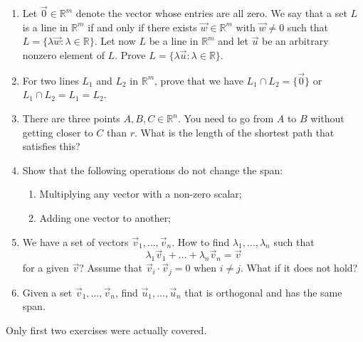 \documentclass{article}
\begin{document}
\begin{enumerate}
    \item Let $\vec 0 \in \mathbb R^m$ denote the vector whose entries are all zero. We say that a set $L$ is a line in $\mathbb R^m$
if and only if there exists $\vec w \in \mathbb R^m$ with $\vec w \neq 0$ such that $L = \{\lambda \vec w : \lambda \in \mathbb R\}$. Let now $L$ be a line in $\mathbb R^m$ and let $\vec u$ be an arbitrary nonzero element of $L$. Prove $L = \{\lambda \vec u : \lambda \in \mathbb R\}$.
\item For two lines $L_1$ and $L_2$ in $\mathbb R^m$, prove that we have $L_1 \cap L_2 = \{\vec 0\}$ or $L_1 \cap L_2 =
L_1 = L_2$.
\item There are three points $A,B,C \in \mathbb R^n$. You need to go from $A$ to $B$ without getting closer to $C$ than $r$. What is the length of the shortest path that satisfies this?
\item Show that the following operations do not change the span:
\begin{enumerate}
    \item Multiplying any vector with a non-zero scalar;
    \item Adding one vector to another;
\end{enumerate}
\item We have a set of vectors $\vec v_1,\dots,\vec v_n$. How to find $\lambda_1,\dots,\lambda_n$ such that
$$
\lambda_1 \vec v_1 + \dots + \lambda_n \vec v_n = \vec v
$$
for a given $\vec v$? Assume that $\vec v_i \cdot \vec v_j = 0$ when $i \neq j$. What if it does not hold?
\item Given a set $\vec v_1, \dots, \vec v_n$, find $\vec u_1, \dots, \vec u_n$ that is orthogonal and has the same span.
\end{enumerate}

Only first two exercises were actually covered.
\end{document}
